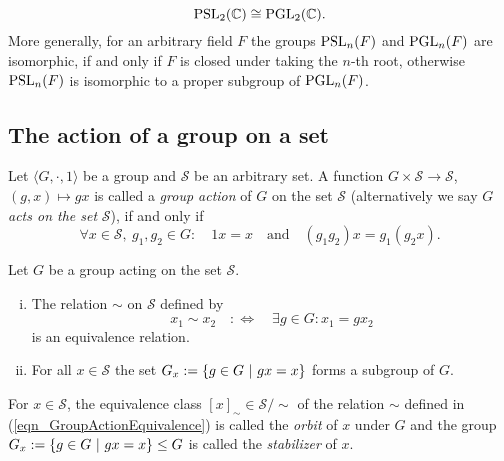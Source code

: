 \begin{example}
\begin{equation*}
\operatorname{PSL}_{2}(\mathbb{C}) \cong \operatorname{PGL}_{2}(\mathbb{C}).
\end{equation*}
More generally, for an arbitrary field $F$ the groups $\operatorname{PSL}_{n}(F)$ and $\operatorname{PGL}_{n}(F)$ are isomorphic, if and only if $F$ is closed under taking the $n$-th root, otherwise $\operatorname{PSL}_{n}(F)$ is isomorphic to a proper subgroup of $\operatorname{PGL}_{n}(F)$.
\end{example}

\subsection{The action of a group on a set}

\begin{definition}
\label{dfn_GroupAction}
Let $\langle G, \cdot, 1 \rangle$ be a group and $\mathcal{S}$ be an arbitrary set. A function $G \times \mathcal{S} \to \mathcal{S}$, $(g, x) \mapsto g x$ is called a \emph{group action} of $G$ on the set $\mathcal{S}$ (alternatively we say $G$ \emph{acts on the set} $\mathcal{S}$), if and only if
\begin{equation}
\label{eqn_GroupAction}
\forall x \in \mathcal{S},\ g_1, g_2 \in G:\quad 1 x = x \quad \text{and} \quad (g_1 g_2) x = g_1 (g_2 x).
\end{equation}
\end{definition}

\begin{theorem}
Let $G$ be a group acting on the set $\mathcal{S}$.
\begin{enumerate}[(i)]
\item The relation $\sim$ on $\mathcal{S}$ defined by
\begin{equation}
\label{eqn_GroupActionEquivalence}
x_1 \sim x_2 \quad:\Leftrightarrow\quad \exists g \in G: x_1 = g x_2
\end{equation}
is an equivalence relation.
\item For all $x \in \mathcal{S}$ the set $G_x := \{ g \in G \ | \ gx = x \}$ forms a subgroup of $G$.
\end{enumerate}
\end{theorem}

\begin{definition}
\label{dfn_OrbitStabilizer}
For $x \in \mathcal{S}$, the equivalence class $[x]_\sim \in \mathcal{S}/\sim$ of the relation $\sim$ defined in (\ref{eqn_GroupActionEquivalence}) is called the \emph{orbit} of $x$ under $G$ and the group $G_x := \{ g \in G \ | \ gx = x \} \le G$ is called the \emph{stabilizer} of $x$.
\end{definition}

